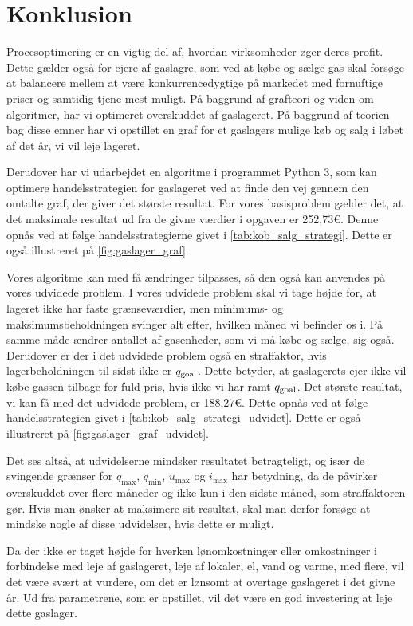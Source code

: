 \chapter{Konklusion}
Procesoptimering er en vigtig del af, hvordan virksomheder øger deres profit. Dette gælder også for ejere af gaslagre, som ved at købe og sælge gas skal forsøge at balancere mellem at være konkurrencedygtige på markedet med fornuftige priser og samtidig tjene mest muligt. På baggrund af grafteori og viden om algoritmer, har vi optimeret overskuddet af gaslageret. På baggrund af teorien bag disse emner har vi opstillet en graf for et gaslagers mulige køb og salg i løbet af det år, vi vil leje lageret. 

Derudover har vi udarbejdet en algoritme i programmet Python 3, som kan optimere handelsstrategien for gaslageret ved at finde den vej gennem den omtalte graf, der giver det største resultat. For vores basisproblem gælder det, at det maksimale resultat ud fra de givne værdier i opgaven er 252,73€. Denne opnås ved at følge handelsstrategierne givet i \autoref{tab:kob_salg_strategi}. Dette er også illustreret på \autoref{fig:gaslager_graf}. 

Vores algoritme kan med få ændringer tilpasses, så den også kan anvendes på vores udvidede problem. I vores udvidede problem skal vi tage højde for, at lageret ikke har faste grænseværdier, men minimums- og maksimumsbeholdningen svinger alt efter, hvilken måned vi befinder os i. På samme måde ændrer antallet af gasenheder, som vi må købe og sælge, sig også. Derudover er der i det udvidede problem også en straffaktor, hvis lagerbeholdningen til sidst ikke er $q_{\textrm{goal}}$. Dette betyder, at gaslagerets ejer ikke vil købe gassen tilbage for fuld pris, hvis ikke vi har ramt $q_{\textrm{goal}}$. Det største resultat, vi kan få med det udvidede problem, er 188,27€. Dette opnås ved at følge handelsstrategien givet i \autoref{tab:kob_salg_strategi_udvidet}. Dette er også illustreret på \autoref{fig:gaslager_graf_udvidet}.


Det ses altså, at udvidelserne mindsker resultatet betragteligt, og især de svingende grænser for $q_{\max}$, $q_{\min}$, $u_{\max}$ og $i_{\max}$ har betydning, da de påvirker overskuddet over flere måneder og ikke kun i den sidste måned, som straffaktoren gør. Hvis man ønsker at maksimere sit resultat, skal man derfor forsøge at mindske nogle af disse udvidelser, hvis dette er muligt.

Da der ikke er taget højde for hverken lønomkostninger eller omkostninger i forbindelse med leje af gaslageret, leje af lokaler, el, vand og varme, med flere, vil det være svært at vurdere, om det er lønsomt at overtage gaslageret i det givne år. Ud fra parametrene, som er opstillet, vil det være en god investering at leje dette gaslager. 


